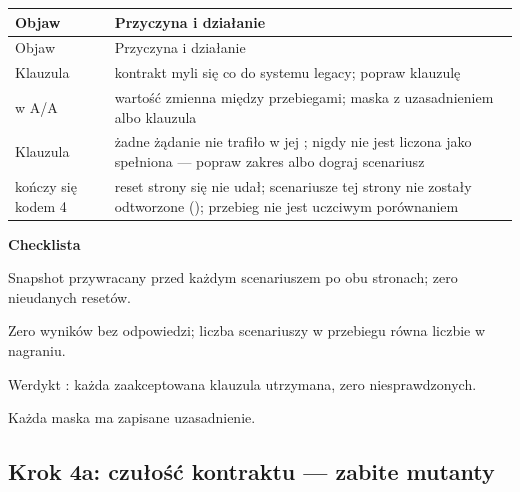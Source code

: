 \begin{xltabular}{\linewidth}{@{}>{\raggedright\arraybackslash}p{5.6cm} >{\raggedright\arraybackslash}X@{}}
\toprule
Objaw & Przyczyna i działanie \\
\midrule
\endfirsthead
\toprule
Objaw & Przyczyna i działanie \\
\midrule
\endhead
Klauzula  & kontrakt myli się co do systemu legacy; popraw klauzulę \\
 w A/A & wartość zmienna między przebiegami; maska z uzasadnieniem albo klauzula \\
Klauzula  & żadne żądanie nie trafiło w jej ; nigdy nie jest liczona jako spełniona --- popraw zakres albo dograj scenariusz \\
 kończy się kodem 4 & reset strony się nie udał; scenariusze tej strony nie zostały odtworzone (); przebieg nie jest uczciwym porównaniem \\
\bottomrule
\end{xltabular}

\textbf{Checklista}
\begin{checklista}
  \item Snapshot przywracany przed każdym scenariuszem po obu stronach; zero nieudanych resetów.
  \item Zero wyników bez odpowiedzi; liczba scenariuszy w przebiegu równa liczbie w nagraniu.
  \item Werdykt : każda zaakceptowana klauzula utrzymana, zero niesprawdzonych.
  \item Każda maska ma zapisane uzasadnienie.
\end{checklista}


\subsection{Krok 4a: czułość kontraktu --- zabite mutanty}\label{sec:procedura-mutanty}

